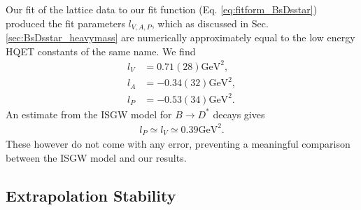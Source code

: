 Our fit of the lattice data to our fit function (Eq. \eqref{eq:fitform_BsDsstar}) produced the fit parameters $l_{V,A,P}$, which as discussed in Sec. \ref{sec:BsDsstar_heavymass} are numerically approximately equal to the low energy HQET constants of the same name. We find
\begin{align}
  \nonumber  l_V &= 0.71(28)\text{GeV}^2, \\  l_A &= -0.34(32)\text{GeV}^2, \label{eq:hqet_constants_hA1}
  \\ \nonumber l_P &= -0.53(34)\text{GeV}^2.
\end{align}
An estimate from the ISGW model for $B\to D^*$ decays gives \cite{PhysRevD.39.799}
\begin{align}
  l_P \simeq l_V \simeq 0.39\text{GeV}^2.
\end{align}
These however do not come with any error, preventing a meaningful comparison between the ISGW model and our results. 

\subsection{Extrapolation Stability}
\label{sec:stability_BsDsstar}

